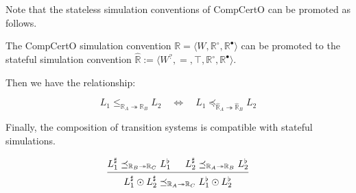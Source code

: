 \documentclass[acmsmall,screen,review,anonymous]{acmart}
\newcommand{\que}{\circ}
\newcommand{\ans}{\bullet}
\begin{document}

Note that the stateless simulation conventions of CompCertO
can be promoted as follows.

\begin{definition}
The CompCertO simulation convention
$\mathbb{R} = \langle W, \mathbb{R}^\que, \mathbb{R}^\ans \rangle$
can be promoted to the stateful simulation convention
$\hat{\mathbb{R}} :=
 \langle W^?, {=}, \top, \mathbb{R}^\que, \mathbb{R}^\ans \rangle$.
\end{definition}

Then we have the relationship:
\begin{lemma}
\[
  L_1 \le_{\mathbb{R}_A \twoheadrightarrow \mathbb{R}_B} L_2
  \quad \Leftrightarrow \quad
  L_1 \preceq_{\hat{\mathbb{R}}_A \twoheadrightarrow \hat{\mathbb{R}}_B} L_2
\]
\end{lemma}

Finally,
the composition of transition systems
is compatible with stateful simulations.

\begin{lemma}
\[
  \begin{prooftree}
    \hypo{
      L_1^\sharp
      \preceq_{\mathbb{R}_B \twoheadrightarrow \mathbb{R}_C}
      L_1^\flat}
    \hypo{
      L_2^\sharp
      \preceq_{\mathbb{R}_A \twoheadrightarrow \mathbb{R}_B}
      L_2^\flat}
    \infer2{
      L_1^\sharp \odot L_2^\sharp
      \preceq_{\mathbb{R}_A \twoheadrightarrow \mathbb{R}_C}
      L_1^\flat \odot L_2^\flat}
  \end{prooftree}
\]
\end{lemma}


\end{document}

